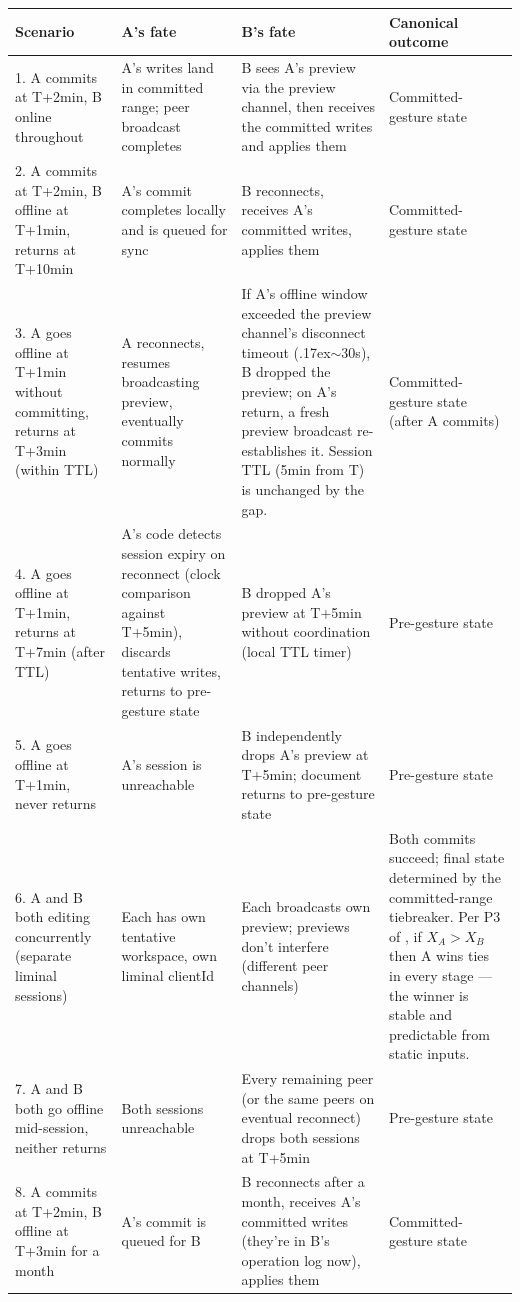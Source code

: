 \begin{table}[t]
\centering
\footnotesize
\begin{tabularx}{\textwidth}{@{}p{}XXp{}@{}}
\toprule
\textbf{Scenario} & \textbf{A's fate} & \textbf{B's fate} & \textbf{Canonical outcome} \\
\midrule
1. A commits at T+2min, B online throughout & A's writes land in committed range; peer broadcast completes & B sees A's preview via the preview channel, then receives the committed writes and applies them & Committed-gesture state \\
2. A commits at T+2min, B offline at T+1min, returns at T+10min & A's commit completes locally and is queued for sync & B reconnects, receives A's committed writes, applies them & Committed-gesture state \\
3. A goes offline at T+1min without committing, returns at T+3min (within TTL) & A reconnects, resumes broadcasting preview, eventually commits normally & If A's offline window exceeded the preview channel's disconnect timeout ({\raise.17ex\hbox{$\scriptstyle\sim$}}30s), B dropped the preview; on A's return, a fresh preview broadcast re-establishes it. Session TTL (5min from T) is unchanged by the gap. & Committed-gesture state (after A commits) \\
4. A goes offline at T+1min, returns at T+7min (after TTL) & A's code detects session expiry on reconnect (clock comparison against T+5min), discards tentative writes, returns to pre-gesture state & B dropped A's preview at T+5min without coordination (local TTL timer) & Pre-gesture state \\
5. A goes offline at T+1min, never returns & A's session is unreachable & B independently drops A's preview at T+5min; document returns to pre-gesture state & Pre-gesture state \\
6. A and B both editing concurrently (separate liminal sessions) & Each has own tentative workspace, own liminal clientId & Each broadcasts own preview; previews don't interfere (different peer channels) & Both commits succeed; final state determined by the committed-range tiebreaker. Per P3 of \cite{plexus:partitioning}, if $X_A > X_B$ then A wins ties in every stage --- the winner is stable and predictable from static inputs. \\
7. A and B both go offline mid-session, neither returns & Both sessions unreachable & Every remaining peer (or the same peers on eventual reconnect) drops both sessions at T+5min & Pre-gesture state \\
8. A commits at T+2min, B offline at T+3min for a month & A's commit is queued for B & B reconnects after a month, receives A's committed writes (they're in B's operation log now), applies them & Committed-gesture state \\
\bottomrule
\end{tabularx}
\end{table}

